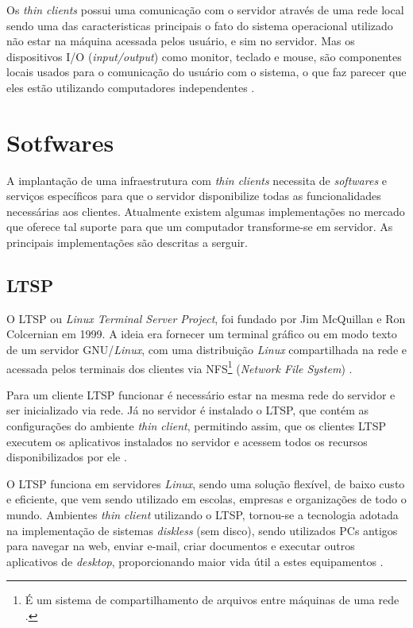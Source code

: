 \documentclass[
	12pt,				%
	openright,			%
	twoside,			%
	a4paper,			%
	chapter=TITLE,		%
	english,			%
	brazil				%
	]{abntex2}
\begin{document}
Os \textit{thin clients} possui uma comunicação com o servidor através de uma rede local sendo uma das caracteristicas principais o fato do sistema operacional utilizado não estar na máquina acessada pelos usuário, e sim no servidor. Mas os dispositivos I/O (\textit{input/output}) como monitor, teclado e mouse, são componentes locais usados para o comunicação do usuário com o sistema, o que faz parecer que eles estão utilizando computadores independentes \cite{richards2007linux, ComoFuncionaThinClient}.


\section{Sotfwares}

A implantação de uma infraestrutura com \textit{thin clients} necessita de \textit{softwares} e serviços específicos para que o servidor disponibilize todas as funcionalidades necessárias aos clientes. Atualmente existem algumas implementações no mercado que oferece tal suporte para que um computador transforme-se em servidor. As principais implementações são descritas a serguir.


\subsection{LTSP}

O LTSP ou \textit{Linux Terminal Server Project}, foi fundado por Jim McQuillan e Ron Colcernian em 1999. A ideia era fornecer um terminal gráfico ou em modo texto de um servidor GNU/\textit{Linux}, com uma distribuição \textit{Linux} compartilhada na rede e acessada pelos terminais dos clientes via NFS\footnote{É um sistema de compartilhamento de arquivos entre máquinas de uma rede \cite{nfs}.} (\textit{Network File System}) \cite{piaui}. 

Para um cliente LTSP funcionar é necessário estar na mesma rede do servidor e ser inicializado via rede.  Já no servidor é instalado o LTSP, que contém as configurações do ambiente \textit{thin client}, permitindo assim, que os clientes LTSP executem os aplicativos instalados no servidor e acessem todos os recursos disponibilizados por ele \cite{piaui}.

O LTSP funciona em servidores \textit{Linux}, sendo uma solução flexível, de baixo custo e eficiente, que vem sendo utilizado em escolas, empresas e organizações de todo o mundo. Ambientes \textit{thin client} utilizando o LTSP, tornou-se a tecnologia adotada na implementação de sistemas \textit{diskless} (sem disco), sendo utilizados PCs antigos para navegar na web, enviar e-mail, criar documentos e executar outros aplicativos de \textit{desktop}, proporcionando maior vida útil a estes equipamentos \cite{piaui,ltsp}.
\end{document}

